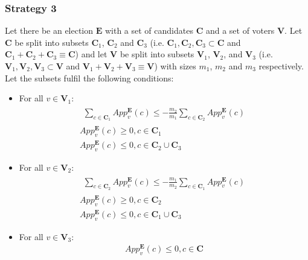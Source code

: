 \documentclass{article}
\begin{document}
\subsubsection{Strategy 3}

Let there be an election $\boldsymbol{E}$ with a set of candidates $\boldsymbol{C}$ and a set of voters $\boldsymbol{V}$. 
Let $\boldsymbol{C}$ be split into subsets $\boldsymbol{C}_{1}$, $\boldsymbol{C}_{2}$ and $\boldsymbol{C}_{3}$ (i.e. $\boldsymbol{C}_{1}, \boldsymbol{C}_{2}, \boldsymbol{C}_{3} \subset \boldsymbol{C}$ and $\boldsymbol{C}_{1}+\boldsymbol{C}_{2}+\boldsymbol{C}_{3} \equiv \boldsymbol{C}$) and let $\boldsymbol{V}$ be split into subsets $\boldsymbol{V}_{1}$, $\boldsymbol{V}_{2}$, and $\boldsymbol{V}_{3}$ (i.e. $\boldsymbol{V}_{1}, \boldsymbol{V}_{2}, \boldsymbol{V}_{3} \subset \boldsymbol{V}$ and $\boldsymbol{V}_{1}+\boldsymbol{V}_{2}+\boldsymbol{V}_{3} \equiv \boldsymbol{V}$) with sizes ${m}_{1}$, ${m}_{2}$ and ${m}_{3}$ respectively.
Let the subsets fulfil the following conditions:\\

\begin{itemize}
    \item For all $v \in \boldsymbol{V}_{1}$:\\
    \begin{gather}
    \begin{split}
        \sum^{}_{c \in \boldsymbol{C}_{1}}{App^{\boldsymbol{E}}_{v}(c)} \leq -\frac{{m}_{2}}{{m}_{1}}\sum^{}_{c \in \boldsymbol{C}_{2}}{App^{\boldsymbol{E}}_{v}(c)}
    \end{split}\\
    App^{\boldsymbol{E}}_{v}(c) \geq 0, c \in \boldsymbol{C}_{1}\\
    App^{\boldsymbol{E}}_{v}(c) \leq 0, c \in \boldsymbol{C}_{2} \cup \boldsymbol{C}_{3}
    \end{gather}
    \item For all $v \in \boldsymbol{V}_{2}$:\\
    \begin{gather}
    \begin{split}
        \sum^{}_{c \in \boldsymbol{C}_{2}}{App^{\boldsymbol{E}}_{v}(c)} \leq -\frac{{m}_{1}}{{m}_{2}}\sum^{}_{c \in \boldsymbol{C}_{1}}{App^{\boldsymbol{E}}_{v}(c)}
    \end{split}\\
    App^{\boldsymbol{E}}_{v}(c) \geq 0, c \in \boldsymbol{C}_{2}\\
    App^{\boldsymbol{E}}_{v}(c) \leq 0, c \in \boldsymbol{C}_{1} \cup \boldsymbol{C}_{3}
    \end{gather}
    \item For all $v \in \boldsymbol{V}_{3}$:\\
    \begin{gather}
        App^{\boldsymbol{E}}_{v}(c) \leq 0, c \in \boldsymbol{C}
    \end{gather}
\end{itemize}
\end{document}
